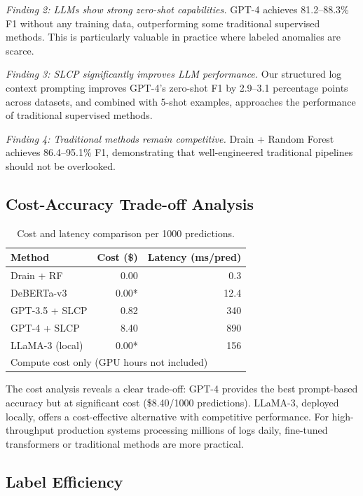 \documentclass[conference]{IEEEtran}
\begin{document}
\textit{Finding 2: LLMs show strong zero-shot capabilities.} GPT-4 achieves 81.2--88.3\% F1 without any training data, outperforming some traditional supervised methods. This is particularly valuable in practice where labeled anomalies are scarce.

\textit{Finding 3: SLCP significantly improves LLM performance.} Our structured log context prompting improves GPT-4's zero-shot F1 by 2.9--3.1 percentage points across datasets, and combined with 5-shot examples, approaches the performance of traditional supervised methods.

\textit{Finding 4: Traditional methods remain competitive.} Drain + Random Forest achieves 86.4--95.1\% F1, demonstrating that well-engineered traditional pipelines should not be overlooked.

\subsection{Cost-Accuracy Trade-off Analysis}

\begin{table}[h]
\centering
\caption{Cost and latency comparison per 1000 predictions.}
\label{tab:cost}
\begin{tabular}{lrr}
\toprule
\textbf{Method} & \textbf{Cost (\$)} & \textbf{Latency (ms/pred)} \\
\midrule
Drain + RF & 0.00 & 0.3 \\
DeBERTa-v3 & 0.00* & 12.4 \\
GPT-3.5 + SLCP & 0.82 & 340 \\
GPT-4 + SLCP & 8.40 & 890 \\
LLaMA-3 (local) & 0.00* & 156 \\
\bottomrule
\multicolumn{3}{l}{\small *Compute cost only (GPU hours not included)} \\
\end{tabular}
\end{table}

The cost analysis reveals a clear trade-off: GPT-4 provides the best prompt-based accuracy but at significant cost (\$8.40/1000 predictions). LLaMA-3, deployed locally, offers a cost-effective alternative with competitive performance. For high-throughput production systems processing millions of logs daily, fine-tuned transformers or traditional methods are more practical.

\subsection{Label Efficiency}
\end{document}
